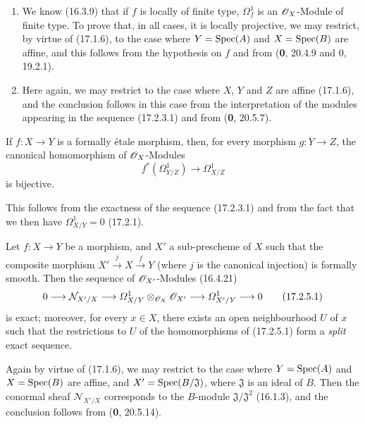 \begin{enumerate}
  \item[(i)] We know (16.3.9) that if $f$ is locally of finite type, $\varOmega_f^1$ is an $\mathscr{O}_X$-Module of finite type. To prove that, in all cases, it is locally projective, we may restrict, by virtue of (17.1.6), to the case where $Y=\operatorname{Spec}(A)$ and $X=\operatorname{Spec}(B)$ are affine, and this follows from the hypothesis on $f$ and from (\textbf{0}, 20.4.9 and 0, 19.2.1).
  \item[(ii)] Here again, we may restrict to the case where $X$, $Y$ and $Z$ are affine (17.1.6), and the conclusion follows in this case from the interpretation of the modules appearing in the sequence (17.2.3.1) and from (\textbf{0}, 20.5.7).
\end{enumerate}

\begin{corollary}[17.2.4]
\label{IV.17.2.4}
If $f:X\to Y$ is a formally étale morphism, then, for every morphism $g:Y\to Z$, the canonical homomorphism of $\mathscr{O}_X$-Modules
\[
  f^*(\varOmega_{Y/Z}^1)\longrightarrow\varOmega_{X/Z}^1
\]
is bijective.
\end{corollary}

This follows from the exactness of the sequence (17.2.3.1) and from the fact that we then have $\varOmega_{X/Y}^1=0$ (17.2.1).

\begin{proposition}[17.2.5]
\label{IV.17.2.5}
Let $f:X\to Y$ be a morphism, and $X'$ a sub-prescheme of $X$ such that the composite morphism $X'\xrightarrow{j}X\xrightarrow{f}Y$ (where $j$ is the canonical injection) is formally smooth. Then the sequence of $\mathscr{O}_{X'}$-Modules \textup{(16.4.21)}
\[
\label{IV.17.2.5.1}
  0\longrightarrow\mathcal{N}_{X'/X}\longrightarrow\varOmega_{X/Y}^1\otimes_{\mathscr{O}_X}\mathscr{O}_{X'}\longrightarrow\varOmega_{X'/Y}^1\longrightarrow0
  \tag{17.2.5.1}
\]
is exact; moreover, for every $x\in X$, there exists an open neighbourhood $U$ of $x$ such that the restrictions to $U$ of the homomorphisms of \textup{(17.2.5.1)} form a \emph{split} exact sequence.
\end{proposition}

Again by virtue of (17.1.6), we may restrict to the case where $Y=\operatorname{Spec}(A)$ and $X=\operatorname{Spec}(B)$ are affine, and $X'=\operatorname{Spec}(B/\mathfrak{J})$, where $\mathfrak{J}$ is an ideal of $B$. Then the conormal sheaf $\mathcal{N}_{X'/X}$ corresponds to the $B$-module $\mathfrak{J}/\mathfrak{J}^2$ (16.1.3), and the conclusion follows from (\textbf{0}, 20.5.14).

